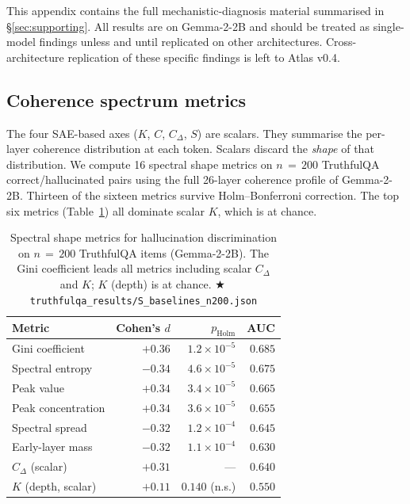 \documentclass[11pt,letterpaper]{article}
\newcommand{\repro}[1]{%
  \textcolor{fathomgreen}{\footnotesize$\bigstar$\,\texttt{#1}}}
\begin{document}
This appendix contains the full mechanistic-diagnosis material summarised
in \S\ref{sec:supporting}. All results are on Gemma-2-2B and should be
treated as single-model findings unless and until replicated on other
architectures. Cross-architecture replication of these specific findings
is left to Atlas v0.4.

\subsection{Coherence spectrum metrics}

The four SAE-based axes ($K$, $C$, $C_\Delta$, $S$) are scalars. They
summarise the per-layer coherence distribution at each token. Scalars
discard the \emph{shape} of that distribution. We compute 16 spectral
shape metrics on $n\,=\,200$ TruthfulQA correct/hallucinated pairs using
the full 26-layer coherence profile of Gemma-2-2B. Thirteen of the sixteen
metrics survive Holm--Bonferroni correction. The top six metrics
(Table~\ref{tab:spectrum}) all dominate scalar $K$, which is at chance.

\begin{table}[h]
\centering
\small
\begin{tabular}{lrrr}
\toprule
Metric & Cohen's $d$ & $p_{\text{Holm}}$ & AUC \\
\midrule
Gini coefficient    & $+0.36$ & $1.2\!\times\!10^{-5}$ & $\mathbf{0.685}$ \\
Spectral entropy    & $-0.34$ & $4.6\!\times\!10^{-5}$ & $0.675$ \\
Peak value          & $+0.34$ & $3.4\!\times\!10^{-5}$ & $0.665$ \\
Peak concentration  & $+0.34$ & $3.6\!\times\!10^{-5}$ & $0.655$ \\
Spectral spread     & $-0.32$ & $1.2\!\times\!10^{-4}$ & $0.645$ \\
Early-layer mass    & $-0.32$ & $1.1\!\times\!10^{-4}$ & $0.630$ \\
\midrule
$C_\Delta$ (scalar) & $+0.31$ & ---                    & $0.640$ \\
$K$ (depth, scalar) & $+0.11$ & $0.140$ (n.s.)         & $0.550$ \\
\bottomrule
\end{tabular}
\caption{Spectral shape metrics for hallucination discrimination on
$n\,=\,200$ TruthfulQA items (Gemma-2-2B). The Gini coefficient leads all
metrics including scalar $C_\Delta$ and $K$; $K$ (depth) is at chance.
\repro{truthfulqa\_results/S\_baselines\_n200.json}}
\label{tab:spectrum}
\end{table}
\end{document}

